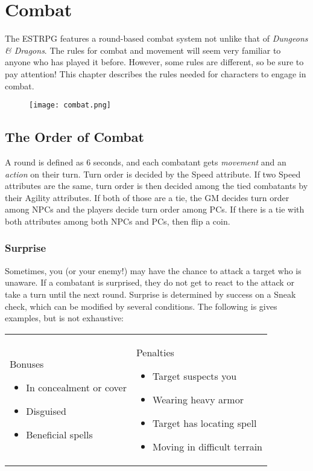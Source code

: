 \chapter{Combat}
The ESTRPG features a round-based combat system not unlike that of \textit{Dungeons \& Dragons}. The rules for combat and movement will seem very familiar to anyone who has played it before. However, some rules are different, so be sure to pay attention! This chapter describes the rules needed for characters to engage in combat.

\begin{figure}[H]
	\texttt{[image: combat.png]}
\end{figure}

\section{The Order of Combat}
A round is defined as 6 seconds, and each combatant gets \textit{movement} and an \textit{action} on their turn. Turn order is decided by the Speed attribute. If two Speed attributes are the same, turn order is then decided among the tied combatants by their Agility attributes. If both of those are a tie, the GM decides turn order among NPCs and the players decide turn order among PCs. If there is a tie with both attributes among both NPCs and PCs, then flip a coin.

\subsection{Surprise}
Sometimes, you (or your enemy!) may have the chance to attack a target who is unaware. If a combatant is surprised, they do not get to react to the attack or take a turn until the next round. Surprise is determined by success on a Sneak check, which can be modified by several conditions. The following is gives examples, but is not exhaustive:

\begin{center}
\begin{tabular}{p{}p{}}
	Bonuses
	\begin{itemize}
		\item In concealment or cover
		\item Disguised
		\item Beneficial spells
	\end{itemize}
	&
	Penalties
	\begin{itemize}
		\item Target suspects you
		\item Wearing heavy armor
		\item Target has locating spell
		\item Moving in difficult terrain
	\end{itemize}\\
\end{tabular}
\end{center}

